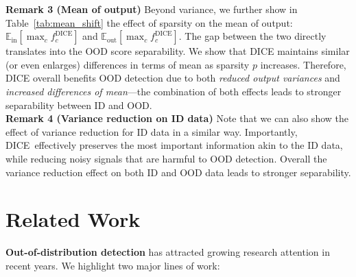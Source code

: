 \documentclass[runningheads]{llncs}
\newcommand{\methodAbbr}{DICE~}
\begin{document}
\begin{table}[t]
\centering
     \caption{\small Difference between the mean of ID's output and OOD's output. Here we use CIFAR-100 as ID data and {$\Delta$=$\mathbb{E}_\text{in}[\max_c f_c^\text{DICE}]$ - $\mathbb{E}_\text{out}[\max_c f_c^\text{DICE}]$} is averaged over six common OOD benchmark datasets described in Section~\ref{sec:experiments}.}
    \label{tab:mean_shift}
\end{table}


\noindent \textbf{Remark 3 (Mean of output)}  Beyond variance, we further show in Table~\ref{tab:mean_shift} the effect of sparsity on the mean of output: $\mathbb{E}_\text{in}[\max_c f_c^\text{DICE}]$ and $\mathbb{E}_\text{out}[\max_c f_c^\text{DICE}]$. The gap between the two directly translates into the OOD score separability. We show that DICE maintains similar (or even enlarges) differences in terms of mean as sparsity $p$ increases. Therefore, DICE overall benefits OOD detection due to both \emph{reduced output variances} and \emph{increased differences of mean}---the combination of both effects leads to stronger separability between ID and OOD. \\

\noindent \textbf{Remark 4 (Variance reduction on ID data)}
Note that we can also show the effect of variance reduction for ID data in a similar way. 
Importantly, \methodAbbr effectively preserves the most important information akin to the ID data, while reducing noisy signals that are harmful to OOD detection. Overall the variance reduction effect on both ID and OOD data leads to stronger separability.






\section{Related Work}
\label{sec:related}
\noindent \textbf{Out-of-distribution detection}  
has attracted growing research attention in recent years. We highlight two major lines of work:
\end{document}
